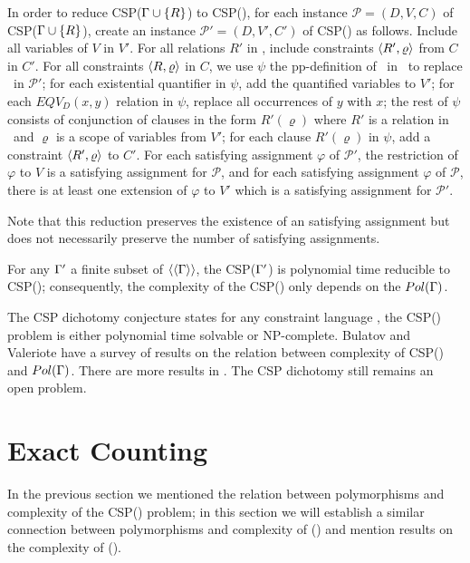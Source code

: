 In order to reduce CSP(\(\Gamma \cup \{{R}\}\)) to CSP(\mrelset),
for each instance \(\mathcal{P}=(D,V,C)\) of CSP(\(\Gamma \cup \{{R}\}\)),
create an instance \(\mathcal{P}'=(D,V',C')\) of CSP(\mrelset) as follows.
Include all variables of \(V\) in \(V'\)\@.
For all relations \(R'\) in \mrelset, include constraints \(\langle R',\varrho \rangle\) from \(C\)
in \(C'\)\@. For all constraints \(\langle R,\varrho \rangle\) in \(C\), we use \(\psi\)
the pp-definition of \mR\ in \mrelset\ to replace \mR\ in \(\mathcal{P}'\);
for each existential quantifier in \(\psi\), add the quantified variables to \(V'\);
for each \(EQV_D(x,y)\) relation in \(\psi\), replace all occurrences of \(y\) with \(x\);
the rest of \(\psi\) consists of conjunction of clauses in the form \(R'(\varrho)\) where
\(R'\) is a relation in \mrelset\ and \(\varrho\) is a scope of variables from \(V'\);
for each clause \(R'(\varrho)\) in \(\psi\), add a constraint \(\langle R',\varrho \rangle\) to \(C'\)\@.
For each satisfying assignment \(\varphi\) of \(\mathcal{P'}\),
the restriction of \(\varphi\) to \(V\) is a satisfying assignment for \(\mathcal{P}\),\@
and for each satisfying assignment \(\varphi\) of \(\mathcal{P}\),
there is at least one extension of \(\varphi\) to \(V'\) which
is a satisfying assignment for \(\mathcal{P}'\)\@.

Note that this reduction preserves the existence of an satisfying assignment
but does not necessarily preserve the number of satisfying assignments.

\begin{cor}
For any \(\Gamma'\) a finite subset of \(\langle\langle \Gamma \rangle\rangle\),
the CSP(\(\Gamma'\)) is polynomial time reducible to  CSP(\mrelset);
consequently, the complexity of the CSP(\mrelset) only depends on the \(Pol(\Gamma)\)\@.
\end{cor}

The CSP dichotomy conjecture states for any constraint language \mrelset, 
the CSP(\mrelset) problem is either polynomial time solvable or NP-complete.
Bulatov and Valeriote \cite{recent08}
have a survey of results on the relation between complexity of CSP(\mrelset) and \(Pol(\Gamma)\).
There are more results in \cite{dur628, valeriote}\@.
The CSP dichotomy still remains an open problem. 

\section{Exact Counting}
In the previous section we mentioned the relation between polymorphisms and complexity of
the CSP(\mrelset) problem; in this section we will establish a similar connection 
between polymorphisms and complexity of \ccsp(\mrelset) and mention 
results on the complexity of \ccsp(\mrelset)\@.

